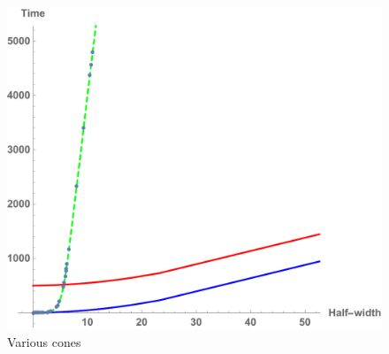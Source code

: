 \documentclass[10pt,aspectratio=169]{beamer}
\begin{document}
\begin{frame}
\begin{minipage}[t]{0.55\linewidth}
\begin{figure}
\begin{center}
        \includegraphics[scale=0.4]{1sidedPhaseDiagram}    
    
    \end{center}
    \caption{Various cones}
    \label{fig:cones}
\end{figure}

\end{minipage}

\end{frame}
\end{document}
